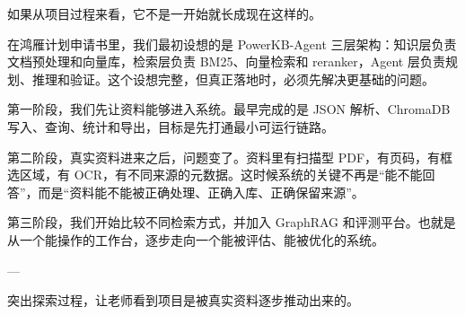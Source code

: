 \documentclass[10pt, a4paper]{ctexart}
\begin{document}
\begin{tcolorbox}[colback=white, colframe=primary!35, title={\textbf{第 3 页：项目从设想到系统}}, beforeafter skip=2.0pt]
\begin{minipage}[t]{0.72\textwidth}
  \linespread{1.0}\selectfont\footnotesize
  如果从项目过程来看，它不是一开始就长成现在这样的。

在鸿雁计划申请书里，我们最初设想的是 PowerKB-Agent 三层架构：知识层负责文档预处理和向量库，检索层负责 BM25、向量检索和 reranker，Agent 层负责规划、推理和验证。这个设想完整，但真正落地时，必须先解决更基础的问题。

第一阶段，我们先让资料能够进入系统。最早完成的是 JSON 解析、ChromaDB 写入、查询、统计和导出，目标是先打通最小可运行链路。

第二阶段，真实资料进来之后，问题变了。资料里有扫描型 PDF，有页码，有框选区域，有 OCR，有不同来源的元数据。这时候系统的关键不再是“能不能回答”，而是“资料能不能被正确处理、正确入库、正确保留来源”。

第三阶段，我们开始比较不同检索方式，并加入 GraphRAG 和评测平台。也就是从一个能操作的工作台，逐步走向一个能被评估、能被优化的系统。

---
\end{minipage}
\hfill
\begin{minipage}[t]{0.25\textwidth}
  \fontsize{7.5}{9.5}\selectfont
  \begin{tcolorbox}[colback=orange!5, colframe=orange!45, title=\textbf{讲述重点}, left=0.6mm, right=0.6mm, top=0.8mm, bottom=0.8mm, arc=0.8mm, boxrule=0.4pt, beforeafter skip=0pt]
    突出探索过程，让老师看到项目是被真实资料逐步推动出来的。
  \end{tcolorbox}
\end{minipage}
\end{tcolorbox}
\end{document}

